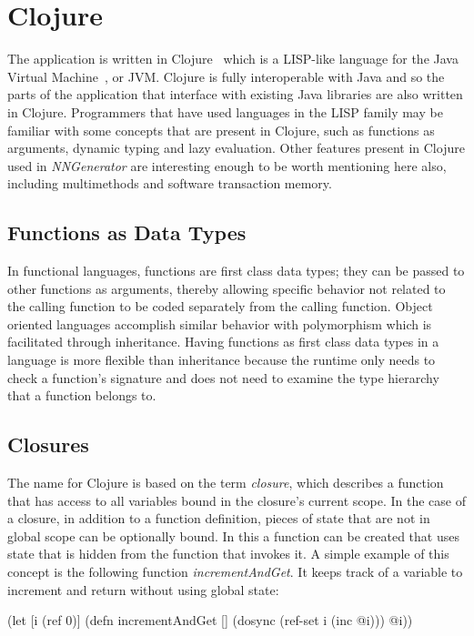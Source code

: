 \section{Clojure}
The application is written in Clojure~\cite{clj} which is a LISP-like language for the Java Virtual Machine~\cite{jvm}, or JVM. 
Clojure is fully interoperable with Java and so the parts of the application that interface with existing Java libraries are also written in Clojure.
Programmers that have used languages in the LISP family may be familiar with some concepts that are present in Clojure, such as
functions as arguments, dynamic typing and lazy evaluation. 
Other features present in Clojure used in {\em NNGenerator} are interesting enough to be worth mentioning here also, including multimethods and software transaction memory.

\subsection{Functions as Data Types}
In functional languages, functions are first class data types; they
can be passed to other functions as arguments, thereby allowing specific behavior not related to the calling function to be coded
separately from the calling function. 
Object oriented languages accomplish similar behavior with polymorphism which is
facilitated through inheritance. 
Having functions as first class data types in a language is more
flexible than inheritance because the runtime only needs to check a
function's signature and does not need to examine the type hierarchy
that a function belongs to.   

\subsection{Closures}
The name for Clojure is based on the term {\it closure}, which
describes a function that has access to all variables bound in the
closure's current scope. 
In the case of a closure, in addition to a function definition, pieces
of state that are not in global scope can be optionally bound. 
In this a function can be created that uses state that is hidden
from the function that invokes it.
A simple example of this concept is the following function {\it incrementAndGet}.
It keeps track of a variable to increment and return without using
global state: 

(let [i (ref 0)]
  (defn incrementAndGet []
     (dosync (ref-set i (inc @i))) @i))

